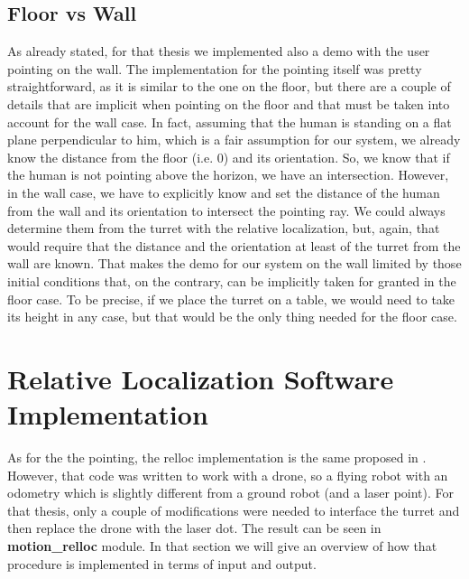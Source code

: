 \subsection{Floor vs Wall}\label{subs:floorwall}
As already stated, for that thesis we implemented also a demo with the user pointing on the wall. The implementation for the pointing itself was pretty straightforward, as it is similar to the one on the floor, but there are a couple of details that are implicit when pointing on the floor and that must be taken into account for the wall case. In fact, assuming that the human is standing on a flat plane perpendicular to him, which is a fair assumption for our system, we already know the distance from the floor (i.e. $0$) and its orientation. So, we know that if the human is not pointing above the horizon, we have an intersection. However, in the wall case, we have to explicitly know and set the distance of the human from the wall and its orientation to intersect the pointing ray. We could always determine them from the turret with the relative localization, but, again, that would require that the distance and the orientation at least of the turret from the wall are known. That makes the demo for our system on the wall limited by those initial conditions that, on the contrary, can be implicitly taken for granted in the floor case. To be precise, if we place the turret on a table, we would need to take its height in any case, but that would be the only thing needed for the floor case.


\section{Relative Localization Software Implementation}
As for the the pointing, the \ac{relloc} implementation is the same proposed in \cite{gromov2018robot}. However, that code was written to work with a drone, so a flying robot with an odometry which is slightly different from a ground robot (and a laser point). For that thesis, only a couple of modifications were needed to interface the turret and then replace the drone with the laser dot. The result can be seen in \textbf{motion\_relloc} module. In that section we will give an overview of how that procedure is implemented in terms of input and output.
